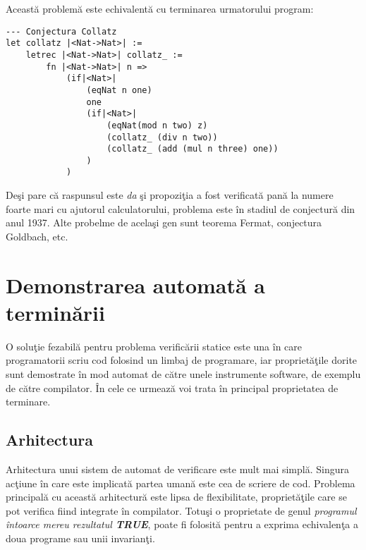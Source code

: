 Aceast\u a problem\u a este echivalent\u a cu terminarea urmatorului program:

\begin{lstlisting}
--- Conjectura Collatz
let collatz |<Nat->Nat>| :=
    letrec |<Nat->Nat>| collatz_ :=
        fn |<Nat->Nat>| n =>
            (if|<Nat>|
                (eqNat n one)
                one
                (if|<Nat>|
                    (eqNat(mod n two) z)
                    (collatz_ (div n two))
                    (collatz_ (add (mul n three) one))
                )
            )
\end{lstlisting}

De\c si pare c\u a raspunsul este \emph{da} \c si propozi\c tia a fost verificat\u a pan\u a la numere foarte mari cu ajutorul calculatorului, problema este \^in stadiul de conjectur\u a din anul 1937. Alte probelme de acela\c si gen sunt teorema Fermat, conjectura Goldbach, etc.


\section{Demonstrarea automat\u a a termin\u arii}

O solu\c tie fezabil\u a pentru problema verific\u arii statice este una \^in care programatorii scriu cod folosind un limbaj de programare, iar propriet\u a\c tile dorite sunt demostrate \^in mod automat de c\u atre unele instrumente software, de exemplu de c\u atre compilator. \^In cele ce urmeaz\u a voi trata \^in principal proprietatea de terminare.

\subsection{Arhitectura}
\done{}

Arhitectura unui sistem de automat de verificare este mult mai simpl\u a. Singura ac\c tiune \^in care este implicat\u a partea uman\u a este cea de scriere de cod. Problema principal\u a cu aceast\u a arhitectur\u a este lipsa de flexibilitate, propriet\u a\c tile care se pot verifica fiind integrate \^in compilator. Totu\c si o proprietate de genul \emph{programul \^intoarce mereu rezultatul \textbf{TRUE}}, poate fi folosit\u a pentru a exprima echivalen\c ta a doua programe sau unii invarian\c ti.

\begin{center}
    
    \label{tbt_arch}
\end{center}


